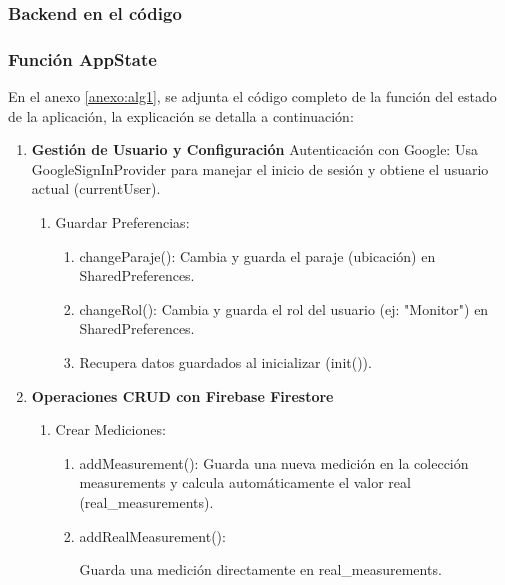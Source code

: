 \subsubsection{Backend en el código}

\subsubsection*{Función AppState}

En el anexo \ref{anexo:alg1}, se adjunta el código completo de la función del estado de la aplicación, la explicación se detalla a continuación:
\begin{enumerate}
    \item \textbf{Gestión de Usuario y Configuración}
    Autenticación con Google: Usa GoogleSignInProvider para manejar el inicio de sesión y obtiene el usuario actual (currentUser).
    
    \begin{enumerate}
      \item Guardar Preferencias:
    
    \begin{enumerate}
      \item changeParaje(): Cambia y guarda el paraje (ubicación) en SharedPreferences.
    
    \item changeRol(): Cambia y guarda el rol del usuario (ej: "Monitor") en SharedPreferences.
    
   \item Recupera datos guardados al inicializar (init()).
    \end{enumerate}
    \end{enumerate}
    
    \item \textbf{Operaciones CRUD con Firebase Firestore}
    \begin{enumerate}
      \item Crear Mediciones:
    
    \begin{enumerate}
      \item addMeasurement(): Guarda una nueva medición en la colección measurements y calcula automáticamente el valor real (real\_measurements).
    
    \item addRealMeasurement(): 
    
    Guarda una medición directamente en real\_measurements.
    \end{enumerate}
    

\end{enumerate}
\end{enumerate}
